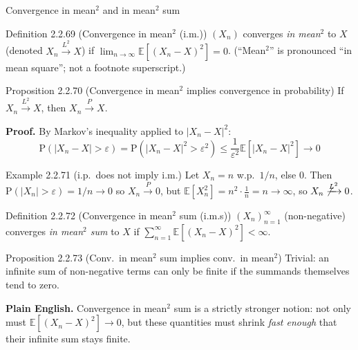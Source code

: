 \documentclass[aspectratio=169,10pt]{beamer}
\begin{document}
\begin{frame}[allowframebreaks]{Convergence in mean$^2$ and in mean$^2$ sum}
\begin{block}{Definition 2.2.69 (Convergence in mean$^2$ (i.m.))}
$(X_n)$ converges \emph{in mean$^2$} to $X$ (denoted $X_n\xrightarrow{L^2}X$)
if $\lim_{n\to\infty}\mathbb{E}[(X_n-X)^2]=0$. (``Mean$^2$'' is pronounced
``in mean square''; not a footnote superscript.)
\end{block}
\begin{block}{Proposition 2.2.70 (Convergence in mean$^2$ implies convergence in probability)}
If $X_n\xrightarrow{L^2}X$, then $X_n\xrightarrow{P}X$.
\end{block}
\textbf{Proof.} By Markov's inequality applied to $|X_n-X|^2$:
\[ \mathrm{P}(|X_n-X|>\varepsilon) = \mathrm{P}(|X_n-X|^2>\varepsilon^2) \leq \frac{1}{\varepsilon^2}\mathbb{E}[|X_n-X|^2] \longrightarrow 0 \]

\begin{block}{Example 2.2.71 (i.p.\ does not imply i.m.)}
Let $X_n=n$ w.p.\ $1/n$, else $0$. Then $\mathrm{P}(|X_n|>\varepsilon)=1/n\to0$
so $X_n\xrightarrow{P}0$, but $\mathbb{E}[X_n^2]=n^2\cdot\tfrac1n=n\to\infty$,
so $X_n\not\xrightarrow{L^2}0$.
\end{block}

\framebreak

\begin{block}{Definition 2.2.72 (Convergence in mean$^2$ sum (i.m.s))}
$(X_n)_{n=1}^\infty$ (non-negative) converges \emph{in mean$^2$ sum} to $X$
if $\sum_{n=1}^{\infty}\mathbb{E}[(X_n-X)^2] < \infty$.
\end{block}
\begin{block}{Proposition 2.2.73 (Conv.\ in mean$^2$ sum implies conv.\ in mean$^2$)}
Trivial: an infinite sum of non-negative terms can only be finite if the
summands themselves tend to zero.
\end{block}
\textbf{Plain English.} Convergence in mean$^2$ sum is a strictly stronger
notion: not only must $\mathbb{E}[(X_n-X)^2]\to0$, but these quantities must
shrink \emph{fast enough} that their infinite sum stays finite.
\end{frame}
\end{document}
